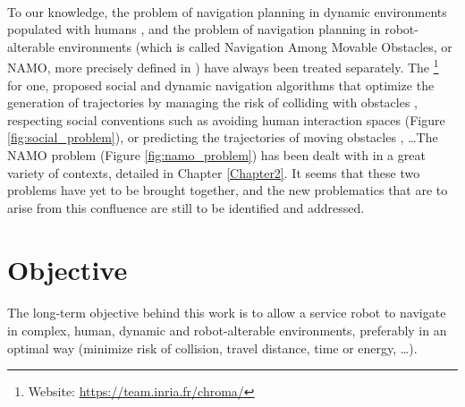 \paragraph{} To our knowledge, the problem of navigation planning in dynamic environments populated with humans \parencite{kruse_human-aware_2013, rios-martinez_proxemics_2015}, and the problem of navigation planning in robot-alterable environments (which is called Navigation Among Movable Obstacles, or NAMO, more precisely defined in \parencite{stilman_navigation_2007}) have always been treated separately. The \groupname \footnote{Website: \url{https://team.inria.fr/chroma/}} \, for one, proposed social and dynamic navigation algorithms that optimize the generation of trajectories by managing the risk of colliding with obstacles \parencite{fulgenzi_autonomous_2009, rios-martinez_socially-aware_2013}, respecting social conventions such as avoiding human interaction spaces \parencite{papadakis_adaptive_2014, rios-martinez_understanding_2011} (Figure \ref{fig:social_problem}), or predicting the trajectories of moving obstacles \parencite{jumel_mapping_2017}, \dots The NAMO problem (Figure \ref{fig:namo_problem}) has been dealt with in a great variety of contexts, detailed in Chapter \ref{Chapter2}. It seems that these two problems have yet to be brought together, and the new problematics that are to arise from this confluence are still to be identified and addressed.

\section{Objective}

\paragraph{} The long-term objective behind this work is to allow a service robot to navigate in complex, human, dynamic and robot-alterable environments, preferably in an optimal way (minimize risk of collision, travel distance, time or energy, \dots).

